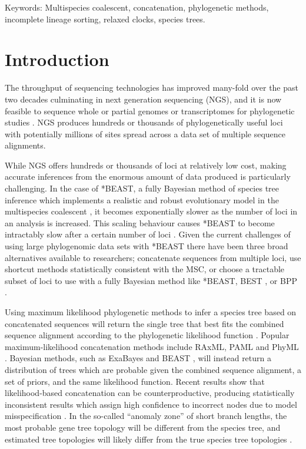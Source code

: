 \documentclass[12pt]{article}
\begin{document}
Keywords: Multispecies coalescent, concatenation, phylogenetic methods, incomplete lineage sorting, relaxed clocks, species trees.

\section{Introduction}

The throughput of sequencing technologies has improved many-fold over the past
two decades culminating in next generation sequencing (NGS), and it is now
feasible to sequence whole or partial genomes or transcriptomes for phylogenetic
studies \citep{annurev-ecolsys-110512-135822}. NGS produces hundreds or
thousands of phylogenetically useful loci \citep[see for example][]{Blom20160181}
with potentially millions of sites spread across a data set of multiple
sequence alignments.

While NGS offers hundreds or thousands of loci at relatively low cost, making
accurate inferences from the enormous amount of data produced is particularly
challenging. In the case of *BEAST, a fully Bayesian method of species tree
inference which implements a realistic and robust evolutionary model in the
multispecies coalescent \citep[MSC;][]{Degnan2009332, Heled01032010}, it becomes exponentially
slower as the number of loci in an analysis is increased. This scaling behaviour
causes *BEAST to become intractably slow after a certain number of loci
\citep[the exact number will depend on other parameters of the data set, see][]{Ogilvie01052016}.
Given the current challenges of using large phylogenomic data sets with *BEAST
there have been three broad alternatives available to researchers; concatenate
sequences from multiple loci, use shortcut methods statistically consistent with the MSC, or choose a tractable
subset of loci to use with a fully Bayesian method like *BEAST, BEST \citep{Liu01112008}, or BPP
\citep{Yang854}.

Using maximum likelihood phylogenetic methods to infer a species tree based on concatenated
sequences will return the single tree that
best fits the combined sequence alignment according to the phylogenetic likelihood function \citep{Felsenstein1981}. Popular maximum-likelihood concatenation methods include
RAxML, PAML and PhyML \citep{Stamatakis01052014,
Yang01082007,Guindon01052010}. Bayesian methods, such as ExaBayes and BEAST
\citep{Aberer01102014, Drummond2007}, will instead return a distribution of trees which are probable
given the combined sequence alignment, a set of priors, and the same likelihood function.
Recent results show that likelihood-based concatenation
can be counterproductive, producing statistically inconsistent results which assign
high confidence to incorrect nodes due to model misspecification
\citep{NYAS:NYAS12747}. In the so-called ``anomaly zone'' of short branch
lengths, the most probable gene tree topology will be different from the species
tree, and estimated tree topologies will likely differ from the true species
tree topologies \citep{journal.pgen.0020068, Kubatko01022007}.
\end{document}
